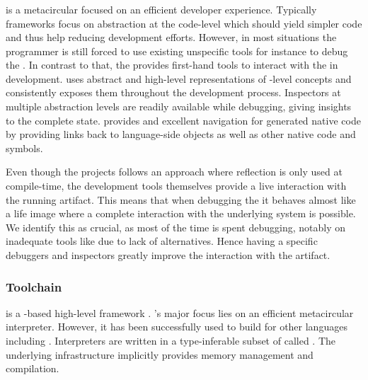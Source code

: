 \subsubsection*{\Maxine \Java \VM}
\Maxine is a metacircular \Java \VM \cite{Wimm13a} focused on an efficient developer experience.
Typically \VM frameworks focus on abstraction at the code-level which should yield simpler code and thus help reducing development efforts.
However, in most situations the programmer is still forced to use existing unspecific tools for instance to debug the \VM.
In contrast to that, the \Maxine \VM provides first-hand tools to interact with the \VM in development.
\Maxine uses abstract and high-level representations of \VM-level concepts and consistently exposes them throughout the development process.
Inspectors at multiple abstraction levels are readily available while debugging, giving insights to the complete \VM state.
\Maxine provides and excellent navigation for generated native code by providing links back to language-side objects as well as other native code and symbols.

Even though the \Maxine projects follows an approach where reflection is only used at compile-time, the development tools themselves provide a live interaction with the running \VM artifact.
This means that when debugging the \VM it behaves almost like a life \ST image where a complete interaction with the underlying system is possible.
We identify this as crucial, as most of the time is spent debugging, notably on inadequate tools like  due to lack of alternatives.
Hence having a specific debuggers and inspectors greatly improve the interaction with the \VM artifact.

\subsubsection*{\PyPy Toolchain}
 is a \Python-based high-level \VM framework \cite{Rigo06a}.
\PyPy's major focus lies on an efficient metacircular \Python interpreter.
However, it has been successfully used to build \VMs for other languages including \ST \cite{Bolz08a}.
Interpreters are written in a type-inferable subset of \Python called \RPython.
The underlying \PyPy infrastructure implicitly provides memory management and \JIT compilation.

